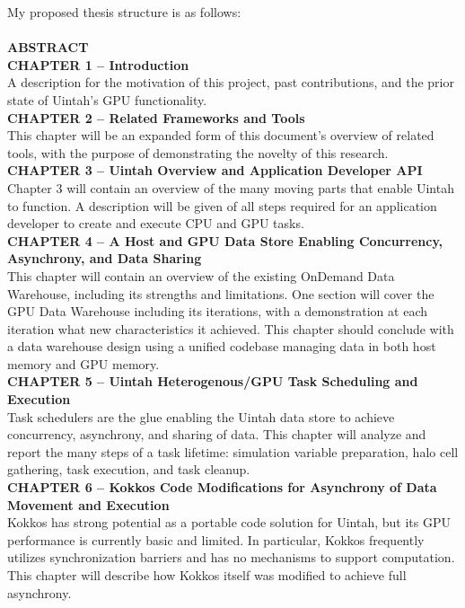 \documentclass[12pt]{article}
\begin{document}
My proposed thesis structure is as follows:\\
\\
\textbf{ABSTRACT}\\
\textbf{CHAPTER 1 – Introduction}\\
A description for the motivation of this project, past contributions, and the prior state of Uintah’s GPU functionality.\\  
\textbf{CHAPTER 2 – Related Frameworks and Tools}\\
This chapter will be an expanded form of this document’s overview of related tools, with the purpose of demonstrating the novelty of this research.\\  
\textbf{CHAPTER 3 – Uintah Overview and Application Developer API}\\
Chapter 3 will contain an overview of the many moving parts that enable Uintah to function.  A description will be given of all steps required for an application developer to create and execute CPU and GPU tasks.\\  
\textbf{CHAPTER 4 -- A Host and GPU Data Store Enabling Concurrency, Asynchrony, and Data Sharing}\\ 
This chapter will contain an overview of the existing OnDemand Data Warehouse, including its strengths and limitations.  One section will cover the GPU Data Warehouse including its iterations, with a demonstration at each iteration what new characteristics it achieved.  This chapter should conclude with a data warehouse design using a unified codebase managing data in both host memory and GPU memory.\\  
\textbf{CHAPTER 5 – Uintah Heterogenous/GPU Task Scheduling and Execution}\\
Task schedulers are the glue enabling the Uintah data store to achieve concurrency, asynchrony, and sharing of data.  This chapter will analyze and report the many steps of a task lifetime: simulation variable preparation, halo cell gathering, task execution, and task cleanup.\\ 
\textbf{CHAPTER 6 – Kokkos Code Modifications for Asynchrony of Data Movement and Execution}\\
Kokkos has strong potential as a portable code solution for Uintah, but its GPU performance is currently basic and limited.  In particular, Kokkos frequently utilizes synchronization barriers and has no mechanisms to support computation. This chapter will describe how Kokkos itself was modified to achieve full asynchrony.\\
\end{document}
